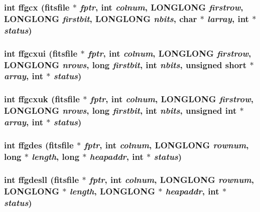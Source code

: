 \subsubsection{\setlength{\rightskip}{0pt plus 5cm}int ffgcx (\bf{fitsfile} $\ast$ {\em fptr}, int {\em colnum}, \bf{LONGLONG} {\em firstrow}, \bf{LONGLONG} {\em firstbit}, \bf{LONGLONG} {\em nbits}, char $\ast$ {\em larray}, int $\ast$ {\em status})}\label{fitsio__64_8h_5442835d3053104e266593e562f35ed6}


\subsubsection{\setlength{\rightskip}{0pt plus 5cm}int ffgcxui (\bf{fitsfile} $\ast$ {\em fptr}, int {\em colnum}, \bf{LONGLONG} {\em firstrow}, \bf{LONGLONG} {\em nrows}, long {\em firstbit}, int {\em nbits}, unsigned short $\ast$ {\em array}, int $\ast$ {\em status})}\label{fitsio__64_8h_b19b10366f2657d82b522b1fb0dd7543}


\subsubsection{\setlength{\rightskip}{0pt plus 5cm}int ffgcxuk (\bf{fitsfile} $\ast$ {\em fptr}, int {\em colnum}, \bf{LONGLONG} {\em firstrow}, \bf{LONGLONG} {\em nrows}, long {\em firstbit}, int {\em nbits}, unsigned int $\ast$ {\em array}, int $\ast$ {\em status})}\label{fitsio__64_8h_93518bd3d82829c1560b2414280b97c2}


\subsubsection{\setlength{\rightskip}{0pt plus 5cm}int ffgdes (\bf{fitsfile} $\ast$ {\em fptr}, int {\em colnum}, \bf{LONGLONG} {\em rownum}, long $\ast$ {\em length}, long $\ast$ {\em heapaddr}, int $\ast$ {\em status})}\label{fitsio__64_8h_c66d84a807557a2d7aa8f1a3b3012100}


\subsubsection{\setlength{\rightskip}{0pt plus 5cm}int ffgdesll (\bf{fitsfile} $\ast$ {\em fptr}, int {\em colnum}, \bf{LONGLONG} {\em rownum}, \bf{LONGLONG} $\ast$ {\em length}, \bf{LONGLONG} $\ast$ {\em heapaddr}, int $\ast$ {\em status})}\label{fitsio__64_8h_3d39c62a134b069e27cc44a8a51f8536}


